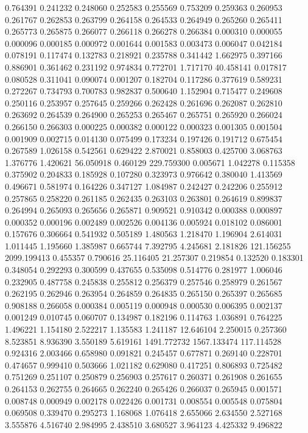 0.764391
0.241232
0.248060
0.252583
0.255569
0.753209
0.259363
0.260953
0.261767
0.262853
0.263799
0.264158
0.264533
0.264949
0.265260
0.265411
0.265773
0.265875
0.266077
0.266118
0.266278
0.266384
0.000310
0.000055
0.000096
0.000185
0.000972
0.001644
0.001583
0.003473
0.006047
0.042184
0.078191
0.117474
0.132783
0.218921
0.235788
0.341442
1.662975
0.397166
0.886901
0.361462
0.231192
0.974834
0.772701
1.717170
40.458141
0.017817
0.080528
0.311041
0.090074
0.001207
0.182704
0.117286
0.377619
0.589231
0.272267
0.734793
0.700783
0.982837
0.500640
1.152904
0.715477
0.249608
0.250116
0.253957
0.257645
0.259266
0.262428
0.261696
0.262087
0.262810
0.263692
0.264539
0.264900
0.265253
0.265467
0.265751
0.265920
0.266024
0.266150
0.266303
0.000225
0.000382
0.000122
0.000323
0.001305
0.001504
0.001909
0.002715
0.014130
0.075499
0.173234
0.197426
0.191712
0.675454
0.267589
1.026158
0.542561
0.629422
2.870021
0.858003
0.425700
3.068763
1.376776
1.420621
56.050918
0.460129
229.759300
0.005671
1.042278
0.115358
0.375902
0.204833
0.185928
0.107280
0.323973
0.976642
0.380040
1.413569
0.496671
0.581974
0.164226
0.347127
1.084987
0.242427
0.242206
0.255912
0.257865
0.258220
0.261185
0.262435
0.263103
0.263801
0.264619
0.899837
0.264994
0.265093
0.265656
0.265871
0.909521
0.910342
0.000388
0.000897
0.000352
0.000196
0.002489
0.002526
0.004136
0.005924
0.018102
0.086001
0.157676
0.306664
0.541932
0.505189
1.480563
1.218470
1.196904
2.614031
1.011445
1.195660
1.385987
0.665744
7.392795
4.245681
2.181826
121.156255
2099.199413
0.455357
0.790616
25.116405
21.257307
0.219854
0.132520
0.183301
0.348054
0.292293
0.300599
0.437655
0.535098
0.514776
0.281977
1.006046
0.232905
0.487758
0.245838
0.255812
0.256379
0.257546
0.258979
0.261567
0.262195
0.262946
0.263954
0.264859
0.264835
0.265150
0.265397
0.265685
0.908188
0.266058
0.000384
0.005119
0.000948
0.000530
0.006395
0.002137
0.001249
0.010745
0.060707
0.134987
0.182196
0.114763
1.036891
0.764225
1.496221
1.154180
2.522217
1.135583
1.241187
12.646104
2.250015
0.257360
8.523851
8.936390
3.550189
5.619161
1491.772732
1567.133474
117.114528
0.924316
2.003466
0.658980
0.091821
0.245457
0.677871
0.269140
0.228701
0.474657
0.999410
0.503666
1.021182
0.629080
0.417251
0.806893
0.725482
0.751269
0.251107
0.250879
0.256903
0.257617
0.260371
0.261908
0.261655
0.264153
0.262755
0.264665
0.262240
0.265426
0.266037
0.265945
0.001571
0.008748
0.000949
0.002178
0.022426
0.001731
0.008554
0.005548
0.075804
0.069508
0.339470
0.295273
1.168068
1.076418
2.655066
2.634550
2.527168
3.555876
4.516740
2.984995
2.438510
3.680527
3.964123
4.425332
9.496822
